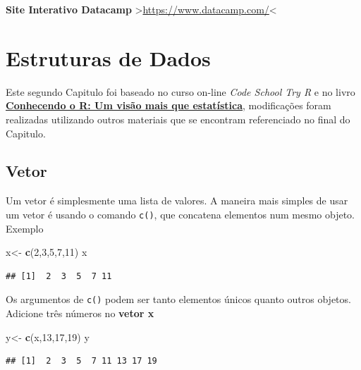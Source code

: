 \documentclass[
]{book}
\newenvironment{Shaded}{\begin{snugshade}}{\end{snugshade}}
\newcommand{\DecValTok}[1]{\textcolor[rgb]{0.00,0.00,0.81}{#1}}
\newcommand{\KeywordTok}[1]{\textcolor[rgb]{0.13,0.29,0.53}{\textbf{#1}}}
\newcommand{\NormalTok}[1]{#1}
\newcommand{\StringTok}[1]{\textcolor[rgb]{0.31,0.60,0.02}{#1}}
\begin{document}
\textbf{Site Interativo Datacamp} \textgreater{}\url{https://www.datacamp.com/}\textless{}

\hypertarget{estruturas-de-dados}{%
\chapter{Estruturas de Dados}\label{estruturas-de-dados}}

Este segundo Capitulo foi baseado no curso on-line \emph{Code School Try R} e no livro \href{https://www.editoraufv.com.br/produto/conhecendo-o-r-uma-visao-mais-que-estatistica/1109294}{\textbf{Conhecendo o R: Um visão mais que estatística}}, modificações foram realizadas utilizando outros materiais que se encontram referenciado no final do Capitulo.

\hypertarget{vetor}{%
\section{Vetor}\label{vetor}}

Um vetor é simplesmente uma lista de valores.
A maneira mais simples de usar um vetor é usando o comando \texttt{c()}, que concatena elementos num mesmo objeto.
Exemplo

\begin{Shaded}
\begin{Highlighting}[]
\NormalTok{x<-}\StringTok{ }\KeywordTok{c}\NormalTok{(}\DecValTok{2}\NormalTok{,}\DecValTok{3}\NormalTok{,}\DecValTok{5}\NormalTok{,}\DecValTok{7}\NormalTok{,}\DecValTok{11}\NormalTok{) }
\NormalTok{x}
\end{Highlighting}
\end{Shaded}

\begin{verbatim}
## [1]  2  3  5  7 11
\end{verbatim}

Os argumentos de \texttt{c()} podem ser tanto elementos únicos quanto outros objetos. Adicione três números no \textbf{vetor x}

\begin{Shaded}
\begin{Highlighting}[]
\NormalTok{y<-}\StringTok{ }\KeywordTok{c}\NormalTok{(x,}\DecValTok{13}\NormalTok{,}\DecValTok{17}\NormalTok{,}\DecValTok{19}\NormalTok{)}
\NormalTok{y}
\end{Highlighting}
\end{Shaded}

\begin{verbatim}
## [1]  2  3  5  7 11 13 17 19
\end{verbatim}
\end{document}
